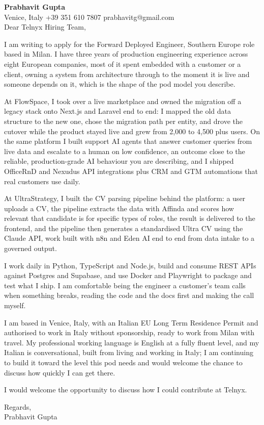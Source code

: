 \documentclass[a4paper,10.5pt]{article}
\begin{document}
\textbf{Prabhavit Gupta}\\
Venice, Italy \textbar{} +39 351 610 7807 \textbar{} prabhavitg@gmail.com\\[10pt]
Dear Telnyx Hiring Team,

I am writing to apply for the Forward Deployed Engineer, Southern Europe role based in Milan. I have three years of production engineering experience across eight European companies, most of it spent embedded with a customer or a client, owning a system from architecture through to the moment it is live and someone depends on it, which is the shape of the pod model you describe.

At FlowSpace, I took over a live marketplace and owned the migration off a legacy stack onto Next.js and Laravel end to end: I mapped the old data structure to the new one, chose the migration path per entity, and drove the cutover while the product stayed live and grew from 2,000 to 4,500 plus users. On the same platform I built support AI agents that answer customer queries from live data and escalate to a human on low confidence, an outcome close to the reliable, production-grade AI behaviour you are describing, and I shipped OfficeRnD and Nexudus API integrations plus CRM and GTM automations that real customers use daily.

At UltraStrategy, I built the CV parsing pipeline behind the platform: a user uploads a CV, the pipeline extracts the data with Affinda and scores how relevant that candidate is for specific types of roles, the result is delivered to the frontend, and the pipeline then generates a standardised Ultra CV using the Claude API, work built with n8n and Eden AI end to end from data intake to a governed output.

I work daily in Python, TypeScript and Node.js, build and consume REST APIs against Postgres and Supabase, and use Docker and Playwright to package and test what I ship. I am comfortable being the engineer a customer's team calls when something breaks, reading the code and the docs first and making the call myself.

I am based in Venice, Italy, with an Italian EU Long Term Residence Permit and authorised to work in Italy without sponsorship, ready to work from Milan with travel. My professional working language is English at a fully fluent level, and my Italian is conversational, built from living and working in Italy; I am continuing to build it toward the level this pod needs and would welcome the chance to discuss how quickly I can get there.

I would welcome the opportunity to discuss how I could contribute at Telnyx.

Regards,\\
Prabhavit Gupta
\end{document}

